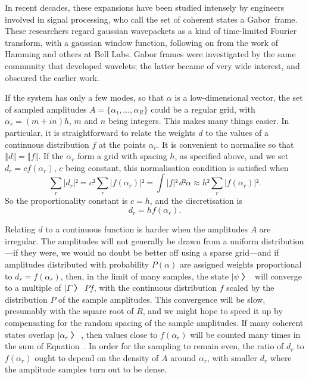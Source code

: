 In recent decades, these expansions have been studied intensely by engineers involved in signal processing, who call the set of coherent states a Gabor~frame.  These researchers regard gaussian wavepackets as a kind of time-limited Fourier transform, with a gaussian window function, following on from the work of Hamming and others at Bell Labs.  Gabor frames were investigated by the same community that developed wavelets; the latter became of very wide interest, and obscured the earlier work.

If the system has only a few modes, so that $α$ is a low-dimensional vector, the set of sampled amplitudes $A=\{α₁, …,α_R\}$ could be a regular grid, with $α_r=(m+in)h$, $m$ and $n$ being integers.  This makes many things easier.  In particular, it is straightforward to relate the weights $d$ to the values of a continuous distribution $f$ at the points $α_r$.  It is convenient to normalise so that $‖d‖=‖f‖$.  If the $α_r$ form a grid with spacing $h$, as specified above, and we set $d_r=cf(α_r)$, $c$ being constant, this normalisation condition is satisfied when
$$∑_r|d_r|²=c²∑_r|f(α_r)|²=\int |f|²\,d²α≈h²∑_r|f(α_r)|².$$
So the proportionality constant is $c=h$, and the discretisation is
$$d_r=hf(α_r).$$

Relating $d$ to a continuous function is harder when the amplitudes $A$ are irregular.  The amplitudes will not generally be drawn from a uniform distribution—if they were, we would no doubt be better off using a sparse grid—and if amplitudes distributed with probability $P(α)$ are assigned weights proportional to $d_r=f(α_r)$, then, in the limit of many samples, the state $|ψ〉$ will converge to a multiple of $|Γ〉Pf$, with the continuous distribution $f$ scaled by the distribution $P$ of the sample amplitudes.   This convergence will be slow, presumably with the square root of $R$, and we might hope to speed it up by compensating for the random spacing of the sample amplitudes.  If many coherent states overlap $|α_r〉$, then values close to $f(α_r)$ will be counted many times in the sum of Equation~\Ad.  In order for the sampling to remain even, the ratio of $d_r$ to $f(α_r)$ ought to depend on the density of $A$ around $α_r$, with smaller $d_r$ where the amplitude samples turn out to be dense.

